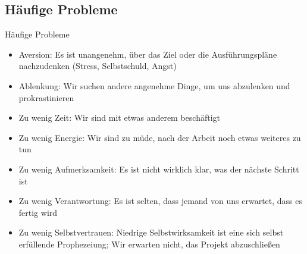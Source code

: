 \subsection{Häufige Probleme}

\begin{frame}[c]{Häufige Probleme}
    \footnotesize
    \begin{itemize}[<+(1)->]
        \item Aversion: Es ist unangenehm, über das Ziel oder die Ausführungspläne nachzudenken (Stress, Selbstschuld, Angst)
        \item Ablenkung: Wir suchen andere angenehme Dinge, um uns abzulenken und prokrastinieren
        \item Zu wenig Zeit: Wir sind mit etwas anderem beschäftigt
        \item Zu wenig Energie: Wir sind zu müde, nach der Arbeit noch etwas weiteres zu tun
        \item Zu wenig Aufmerksamkeit: Es ist nicht wirklich klar, was der nächste Schritt ist
        \item Zu wenig Verantwortung: Es ist selten, dass jemand von uns erwartet, dass es fertig wird
        \item Zu wenig Selbstvertrauen: Niedrige Selbstwirksamkeit ist eine sich selbst erfüllende Prophezeiung; Wir erwarten nicht, das Projekt abzuschließen
    \end{itemize}
\end{frame}


